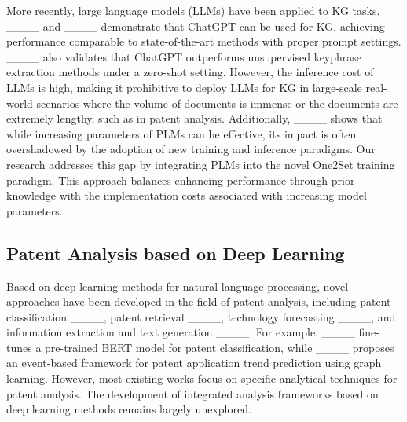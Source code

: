 More recently, large language models (LLMs) have been applied to KG tasks. ____ and ____ demonstrate that ChatGPT can be used for KG, achieving performance comparable to state-of-the-art methods with proper prompt settings. ____ also validates that ChatGPT outperforms unsupervised keyphrase extraction methods under a zero-shot setting. However, the inference cost of LLMs is high, making it prohibitive to deploy LLMs for KG in large-scale real-world scenarios where the volume of documents is immense or the documents are extremely lengthy, such as in patent analysis. Additionally, ____ shows that while increasing  parameters of PLMs can be effective, its impact is often overshadowed by the adoption of new training and inference paradigms. Our research addresses this gap by integrating PLMs into the novel One2Set training paradigm. This approach balances enhancing performance through prior knowledge with the implementation costs associated with increasing model parameters.


\subsection{Patent Analysis based on Deep Learning}
Based on deep learning methods for natural language processing, novel approaches have been developed in the field of patent analysis, including patent classification ____, patent retrieval ____, technology forecasting ____, and information extraction and text generation ____. For example, ____ fine-tunes a pre-trained BERT model for patent classification, while ____ proposes an event-based framework for patent application trend prediction using graph learning. However, most existing works focus on specific analytical techniques for patent analysis. The development of integrated analysis frameworks based on deep learning methods remains largely unexplored.

